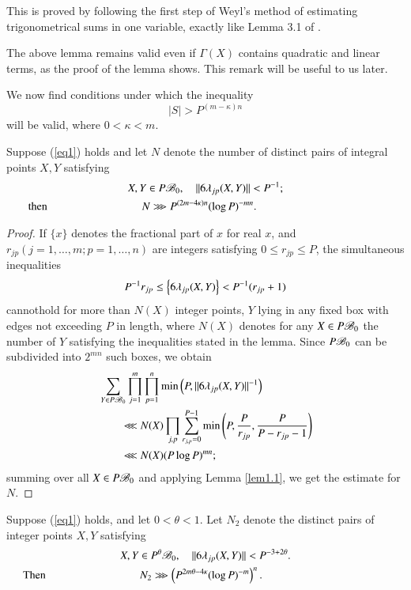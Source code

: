 This is proved by following the first step of Weyl's method of 
estimating trigonometrical sums in one variable, exactly like Lemma 3.1
 of \cite{key3}.

The above lemma remains valid even if $\Gamma(X)$ contains quadratic 
and linear terms, as the proof of the lemma shows. This remark will be 
useful to us later. 

We now find conditions under which the inequality
\begin{equation}\label{eq1}
|S|>P^{(m-\kappa)n}
\end{equation}
will be valid, where $0<\kappa<m$.
\begin{lemma}\label{lem1.2}
Suppose (\ref{eq1}) holds and let $N$ denote the number of distinct 
pairs of integral points $X,Y$ satisfying 
\begin{gather*}
 X,Y\in P\sB_0,\quad ||6\lambda_{jp}(X,Y)||<P^{-1};\\
\text{then}\hspace{3cm} N\ggg P^{(2m-4\kappa)n}(\log P)^{-mn}.\hspace{4cm}
\end{gather*}
\end{lemma}
\begin{proof}
If $\{x\}$ denotes the fractional part of $x$ for real $x$, and 
$r_{jp}(j=1,\ldots,m;p=1,\ldots,n)$ are integers satisfying $0\leq 
r_{jp}\leq P$, the simultaneous inequalities
$$
P^{-1}r_{jp}\leq\left\{{6\lambda_{jp}(X,Y)}\right\}<P^{-1}(r_{jp}+1)
$$
cannot\pageoriginale hold for more than $N(X)$ integer points, $Y$ 
lying in any fixed box with edges not exceeding $P$ in length, where 
$N(X)$ denotes for any $X\in P\mathscr{B}_0$ the number of $Y$ satisfying the 
inequalities stated in the lemma. Since $P\mathscr{B}_0$ can be subdivided 
into $2^{mn}$ such boxes, we obtain
\begin{align*}
&\sum\limits_{Y\in P\mathscr{B}_0}\prod\limits_{j=1}^m\prod\limits_{p=1}^n\min 
\left({P,||6\lambda_{jp}(X,Y)||^{-1}}\right)\\
&\qquad \lll N(X)\prod\limits_{j,p} 
\sum\limits_{r_{j,p}=0}^{P-1}\min \left({P, \frac{P}{r_{jp}}, 
\frac{P}{P-r_{jp}-1}}\right)\\
&\qquad \lll N(X)(P\log P)^{mn};
\end{align*}
summing over all $X\in P\mathscr{B}_0$ and applying Lemma \ref{lem1.1}, we get 
the estimate for $N$.
\end{proof}
\begin{lemma}\label{lem1.3}
Suppose (\ref{eq1}) holds, and let $0<\theta < 1$. Let $N_2$ denote 
the distinct pairs of integer points $X,Y$ satisfying  
\begin{gather*}
 X,Y\in P^\theta\sB_0,\quad ||6\lambda_{jp}(X,Y)||<P^{-3+2\theta}.\\
\text{Then}\hspace{3cm} N_2\ggg \oset{P^{2m\theta-4\kappa}(\log P)^{-m}}^n.\hspace{4cm}
\end{gather*}
\end{lemma}
